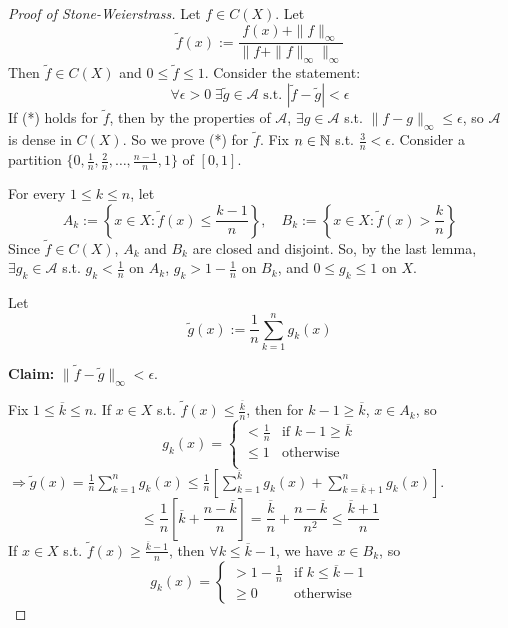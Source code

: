 \begin{proof}[Proof of Stone-Weierstrass]
    Let $f \in C(X)$. Let 
    \[
        \tilde{f}(x) := \frac{f(x) + \| f \|_{\infty} }{\| f + \| f \|_{\infty}  \|_{\infty} }
    \]
    Then $\tilde{f} \in C(X)$ and $0 \leq \tilde{f} \leq 1$. 
    Consider the statement: 
    \[
        \forall \epsilon > 0 \; \exists \tilde{g} \in \mathcal{A} \text{ s.t. }
        |\tilde{f} - \tilde{g}| < \epsilon \tag{*}
    \]
    If (*) holds for $\tilde{f}$, then by the properties of $\mathcal{A}$, $\exists g \in \mathcal{A}$
    s.t. $\| f - g \|_{\infty} \leq \epsilon$, so $\mathcal{A}$ is dense in $C(X)$. So we prove (*) for $\tilde{f}$.  
    Fix $n \in \mathbb{N}$ s.t. $\frac{3}{n} < \epsilon$. 
    Consider a partition $\{ 0, \frac{1}{n}, \frac{2}{n}, \ldots, \frac{n - 1}{n}, 1 \}$ of 
    $[0, 1]$.
    
    For every $1 \leq k \leq n$, let
    \[
        A_k := \left\{ x \in X  : \tilde{f}(x) \leq \frac{k - 1}{n} \right\}, \quad
        B_k := \left\{ x \in X : \tilde{f}(x) > \frac{k}{n} \right\} 
    \] 
    Since $\tilde{f} \in C(X)$, $A_k $ and $B_k$ are closed and disjoint. So, by the last lemma,
    $\exists g_k \in \mathcal{A}$ s.t. $g_k < \frac{1}{n}$ on $A_k$, $g_k > 1 - \frac{1}{n}$ on $B_k$,
    and $0 \leq g_k \leq 1$ on $X$.

    Let 
    \[
        \tilde{g}(x) := \frac{1}{n} \sum_{k = 1}^n g_k(x)
    \]
    
    \noindent \textbf{Claim:} $\| \tilde{f} - \tilde{g} \|_{\infty} < \epsilon$.
    
    \noindent Fix $1 \leq \overline{k} \leq n$. If $x \in X$ s.t. 
    $\tilde{f}(x) \leq \frac{\overline{k}}{n}$, then for $k - 1 \geq \overline{k}$, $x \in A_k$,
    so
    \[
        g_k(x) = \begin{cases}
            < \frac{1}{n} & \text{if } k - 1 \geq \overline{k} \\
            \leq 1 & \text{otherwise} \\
        \end{cases}   
    \]       
    $\Rightarrow \tilde{g}(x) = \frac{1}{n}\sum_{k=1}^{n} g_k(x) \leq 
    \frac{1}{n}[\sum_{k=1}^{\overline{k}}g_k(x) +\sum_{k=\overline{k} + 1}^{n}g_k(x)] $.
    \[
        \leq \frac{1}{n} \left[ \overline{k} + \frac{n - \overline{k}}{n} \right] 
        = \frac{\overline{k}}{n} + \frac{n - \overline{k}}{n^2} \leq \frac{\overline{k} + 1}{n}
    \]
    If $x \in X$ s.t. $\tilde{f}(x) \geq \frac{\overline{k} - 1}{n}$, then $\forall k \leq \overline{k} -1$,
    we have $x \in B_k$, so 
    \[
        g_k(x) = \begin{cases}
            > 1 - \frac{1}{n} & \text{if } k \leq \overline{k} - 1 \\
            \geq 0 & \text{otherwise}
        \end{cases}
    \]   


\end{proof}
